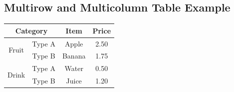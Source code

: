 \documentclass[12pt, a4paper]{article}
\begin{document}
\begin{english}

\section*{Multirow and Multicolumn Table Example}

\begin{tabular}{|c|c|c|c|}
  \hline
  \multicolumn{2}{|c|}{\textbf{Category}} & \textbf{Item} & \textbf{Price} \\
  \hline
  \multirow{2}{*}{Fruit} & Type A & Apple  & 2.50 \\
                        & Type B & Banana & 1.75 \\
  \hline
  \multirow{2}{*}{Drink} & Type A & Water  & 0.50 \\
                        & Type B & Juice  & 1.20 \\
  \hline
\end{tabular}

\end{english}
\end{document}
